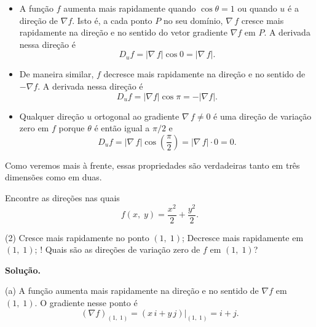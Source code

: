 \begin{itemize}
	\item A função \(f\) aumenta mais rapidamente quando \(\cos \theta = 1\) ou quando \(u\) é a direção de \(\nabla f\).
	Isto é, a cada ponto \(P\) no seu domínio, \(\nabla\, f\) cresce mais rapidamente na direção  e no sentido do vetor gradiente \(\nabla f \) em \(P\). A derivada nessa direção é
	\begin{equation*}
		D_{u}f=|\nabla\, f|\cos 0 = |\nabla\, f|.
	\end{equation*}
	
	\item De maneira similar, \(f\) decresce mais rapidamente na direção e no sentido de \(-\nabla f \). A derivada nessa direção é
	\begin{equation*}
		D_{u}f=|\nabla f|\cos \pi = -|\nabla f|.
	\end{equation*}
	
	\item Qualquer direção \(u\) ortogonal ao gradiente \(\nabla\, f \neq 0\) é uma direção de variação zero em \(f\) porque \(\theta\) é então igual a \( \pi/2\) e
	\begin{equation*}
		D_{u}f=|\nabla\, f|\cos\left(\frac{\pi}{2} \right) = |\nabla\, f|\cdot 0= 0.
	\end{equation*}
\end{itemize}

Como veremos mais à frente, essas propriedades são verdadeiras tanto em três dimensões como em duas.
\begin{exc}
	Encontre as direções nas quais
	\begin{equation*}
		f(x,\; y) = \frac{x^{2}}{2} + \frac{y^{2}}{2}.
	\end{equation*}
	\begin{tasks}[label=(\alph*),item-indent=3em,label-width=4ex,ref=(\alph*)](2)
		\task Cresce mais rapidamente no ponto \((1,\; 1)\);
		\task Decresce mais rapidamente em \((1,\; 1)\);
		\task! Quais são as direções de variação zero de \(f\) em \((1,\; 1)\)?
	\end{tasks}
\end{exc}

\textbf{Solução.}

(a) A função aumenta mais rapidamente na direção e no sentido de \(\nabla f\) em \( (1,\; 1)\). O gradiente nesse ponto é
\begin{equation*}
	(\nabla f)_{(1,\; 1)}=(x\, i + y\, j)\Big\vert_{(1,\; 1)}=i+j.
\end{equation*}

